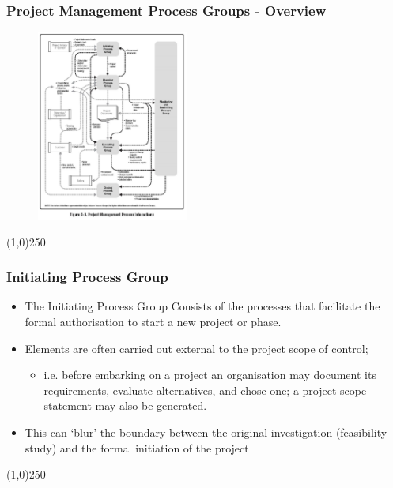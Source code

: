 \begin{frame}
\frametitle{Project Management Process Groups - Overview}
 \begin{figure}
 	\centering
 		\includegraphics[width = 5cm]{images/Fig3-3.jpg}
 	\label{fig:3-3}
 \end{figure}
\end{frame}
\begin{center}\line(1,0){250}\end{center}



\begin{frame}
\frametitle{Initiating Process Group}
\begin{itemize}
	\item The Initiating Process Group Consists of the processes that facilitate the formal authorisation to start a new project or phase.\\
	\item Elements are often carried out external to the project scope of control; \\
		\begin{itemize}
			\item i.e. before embarking on a project an organisation may document its requirements, evaluate alternatives, and chose one; a project scope statement may also be generated. 
		\end{itemize}
	\item This can `blur' the boundary between the original investigation (feasibility study) and the formal initiation of the project\\
\end{itemize}
\end{frame}
\begin{center}\line(1,0){250}\end{center}



